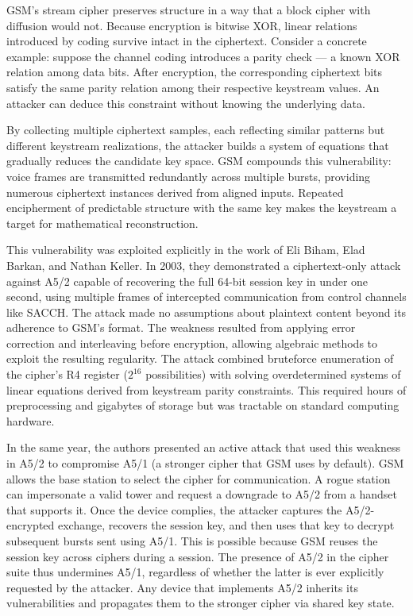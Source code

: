 GSM's stream cipher preserves structure in a way that a block cipher with diffusion would not. Because encryption is bitwise XOR, linear relations introduced by coding survive intact in the ciphertext. Consider a concrete example: suppose the channel coding introduces a parity check — a known XOR relation among data bits. After encryption, the corresponding ciphertext bits satisfy the same parity relation among their respective keystream values. An attacker can deduce this constraint without knowing the underlying data.

By collecting multiple ciphertext samples, each reflecting similar patterns but different keystream realizations, the attacker builds a system of equations that gradually reduces the candidate key space. GSM compounds this vulnerability: voice frames are transmitted redundantly across multiple bursts, providing numerous ciphertext instances derived from aligned inputs. Repeated encipherment of predictable structure with the same key makes the keystream a target for mathematical reconstruction.

This vulnerability was exploited explicitly in the work of Eli Biham, Elad Barkan, and Nathan Keller. In 2003, they demonstrated a ciphertext-only attack against A5/2 capable of recovering the full 64-bit session key in under one second, using multiple frames of intercepted communication from control channels like SACCH. The attack made no assumptions about plaintext content beyond its adherence to GSM’s format. The weakness resulted from applying error correction and interleaving before encryption, allowing algebraic methods to exploit the resulting regularity. The attack combined bruteforce enumeration of the cipher's R4 register ($2^{16}$ possibilities) with solving overdetermined systems of linear equations derived from keystream parity constraints. This required hours of preprocessing and gigabytes of storage but was tractable on standard computing hardware.

In the same year, the authors presented an active attack that used this weakness in A5/2 to compromise A5/1 (a stronger cipher that GSM uses by default). GSM allows the base station to select the cipher for communication. A rogue station can impersonate a valid tower and request a downgrade to A5/2 from a handset that supports it. Once the device complies, the attacker captures the A5/2-encrypted exchange, recovers the session key, and then uses that key to decrypt subsequent bursts sent using A5/1. This is possible because GSM reuses the session key across ciphers during a session. The presence of A5/2 in the cipher suite thus undermines A5/1, regardless of whether the latter is ever explicitly requested by the attacker. Any device that implements A5/2 inherits its vulnerabilities and propagates them to the stronger cipher via shared key state.

